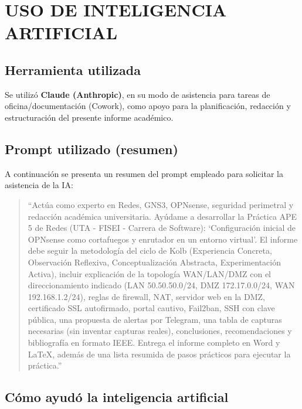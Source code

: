 \documentclass{article}
\renewcommand{\_}{\oldunderscore\hskip0pt\relax}
\begin{document}
\hypertarget{uso-de-inteligencia-artificial}{%
\section{USO DE INTELIGENCIA
ARTIFICIAL}\label{uso-de-inteligencia-artificial}}

\hypertarget{herramienta-utilizada}{%
\subsection{Herramienta utilizada}\label{herramienta-utilizada}}

Se utilizó \textbf{Claude (Anthropic)}, en su modo de asistencia para
tareas de oficina/documentación (Cowork), como apoyo para la
planificación, redacción y estructuración del presente informe
académico.

\hypertarget{prompt-utilizado-resumen}{%
\subsection{Prompt utilizado (resumen)}\label{prompt-utilizado-resumen}}

A continuación se presenta un resumen del prompt empleado para solicitar
la asistencia de la IA:

\begin{quote}
``Actúa como experto en Redes, GNS3, OPNsense, seguridad perimetral y
redacción académica universitaria. Ayúdame a desarrollar la Práctica APE
5 de Redes (UTA - FISEI - Carrera de Software): `Configuración inicial
de OPNsense como cortafuegos y enrutador en un entorno virtual'. El
informe debe seguir la metodología del ciclo de Kolb (Experiencia
Concreta, Observación Reflexiva, Conceptualización Abstracta,
Experimentación Activa), incluir explicación de la topología WAN/LAN/DMZ
con el direccionamiento indicado (LAN 50.50.50.0/24, DMZ 172.17.0.0/24,
WAN 192.168.1.2/24), reglas de firewall, NAT, servidor web en la DMZ,
certificado SSL autofirmado, portal cautivo, Fail2ban, SSH con clave
pública, una propuesta de alertas por Telegram, una tabla de capturas
necesarias (sin inventar capturas reales), conclusiones, recomendaciones
y bibliografía en formato IEEE. Entrega el informe completo en Word y
LaTeX, además de una lista resumida de pasos prácticos para ejecutar la
práctica.''
\end{quote}

\hypertarget{cuxf3mo-ayuduxf3-la-inteligencia-artificial}{%
\subsection{Cómo ayudó la inteligencia
artificial}\label{cuxf3mo-ayuduxf3-la-inteligencia-artificial}}
\end{document}
